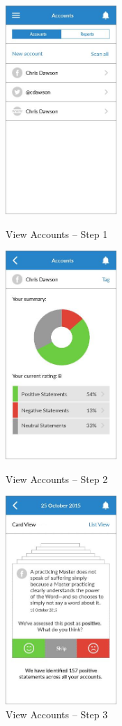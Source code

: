 \begin{figure}
  \subfigures
  \centering
  \begin{minipage}{4.6cm}
    \centering
    \includegraphics[width=4.2cm]{inc/ui_view_step1.jpg}
    \caption{View Accounts -- Step 1}
    \label{fig:ui_view_step1}
  \end{minipage}
  \begin{minipage}{4.6cm}
    \centering
    \includegraphics[width=4.2cm]{inc/ui_view_step2.jpg}
    \caption{View Accounts -- Step 2}
    \label{fig:ui_view_step2}
  \end{minipage}
  \begin{minipage}{4.6cm}
    \centering
    \includegraphics[width=4.2cm]{inc/ui_view_step3.jpg}
    \caption{View Accounts -- Step 3}
    \label{fig:ui_view_step3}
  \end{minipage}
\end{figure}


